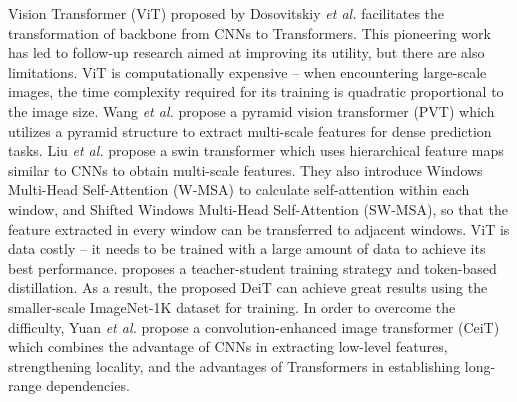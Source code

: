 \documentclass[10pt,journal]{IEEEtran}
\begin{document}
Vision Transformer (ViT) \cite{dosovitskiyImageWorth16x162020} proposed by Dosovitskiy \textit{et al.} facilitates the transformation of backbone from CNNs to Transformers. This pioneering work has led to follow-up research aimed at improving its utility, but there are also limitations.
ViT is computationally expensive -- when encountering large-scale images, the time complexity required for its training is quadratic proportional to the image size. Wang \textit{et al.} \cite {wangPyramidVisionTransformer2021} propose a pyramid vision transformer (PVT) which utilizes a pyramid structure to extract multi-scale features for dense prediction tasks. Liu \textit{et al.} \cite{liuSwinTransformerHierarchical2021} propose a swin transformer which uses hierarchical feature maps similar to CNNs to obtain multi-scale features. They also introduce Windows Multi-Head Self-Attention (W-MSA) to calculate self-attention within each window, and Shifted Windows Multi-Head Self-Attention (SW-MSA), so that the feature extracted in every window can be transferred to adjacent windows. 
ViT is data costly -- it needs to be trained with a large amount of data to achieve its best performance. 
\cite{touvronTrainingDataefficientImage2021} proposes a teacher-student training strategy and token-based distillation. As a result, the proposed DeiT can achieve great results using the smaller-scale ImageNet-1K dataset for training.
In order to overcome the difficulty, Yuan \textit{et al.} \cite{yuanIncorporatingConvolutionDesigns2021} propose a convolution-enhanced image transformer (CeiT) which combines the advantage of CNNs in extracting low-level features, strengthening locality, and the advantages of Transformers in establishing long-range dependencies. 
\end{document}
